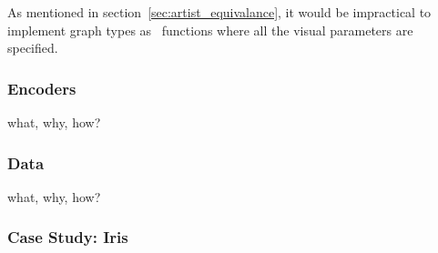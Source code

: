 \documentclass[../main.tex]{subfiles}
\begin{document}
As mentioned in section~\ref{sec:artist_equivalance}, it would be impractical to implement graph types as \vartist\ functions where all the visual parameters are specified.  

\subsubsection{Encoders \vchannel}
what, why, how?
\subsubsection{Data \dtotal}
what, why, how?

\subsubsection{Case Study: Iris}
\end{document}
